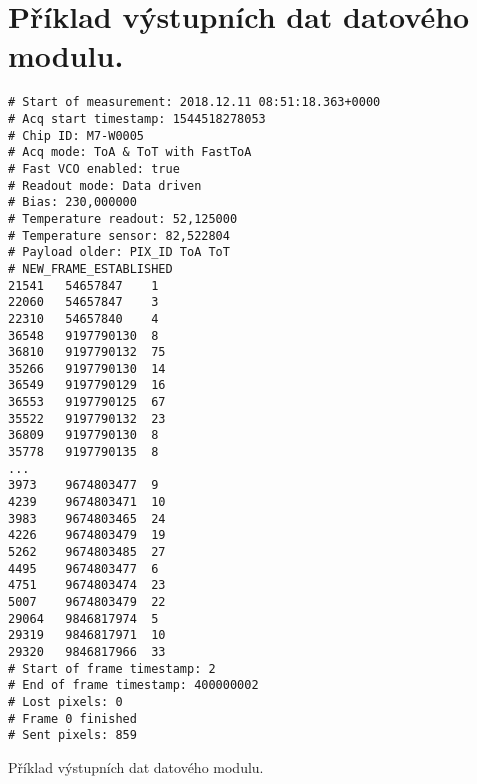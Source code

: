 \section{Příklad výstupních dat datového modulu.}\label{chap:app:katherine:data_example}
\begin{code}[h!]
\begin{verbatim}
# Start of measurement: 2018.12.11 08:51:18.363+0000
# Acq start timestamp: 1544518278053
# Chip ID: M7-W0005
# Acq mode: ToA & ToT with FastToA
# Fast VCO enabled: true
# Readout mode: Data driven
# Bias: 230,000000
# Temperature readout: 52,125000
# Temperature sensor: 82,522804
# Payload older: PIX_ID	ToA	ToT
# NEW_FRAME_ESTABLISHED
21541	54657847	1
22060	54657847	3
22310	54657840	4
36548	9197790130	8
36810	9197790132	75
35266	9197790130	14
36549	9197790129	16
36553	9197790125	67
35522	9197790132	23
36809	9197790130	8
35778	9197790135	8
...
3973	9674803477	9
4239	9674803471	10
3983	9674803465	24
4226	9674803479	19
5262	9674803485	27
4495	9674803477	6
4751	9674803474	23
5007	9674803479	22
29064	9846817974	5
29319	9846817971	10
29320	9846817966	33
# Start of frame timestamp: 2
# End of frame timestamp: 400000002
# Lost pixels: 0
# Frame 0 finished
# Sent pixels: 859

\end{verbatim}
\caption{Příklad výstupních dat datového modulu.}
\end{code}